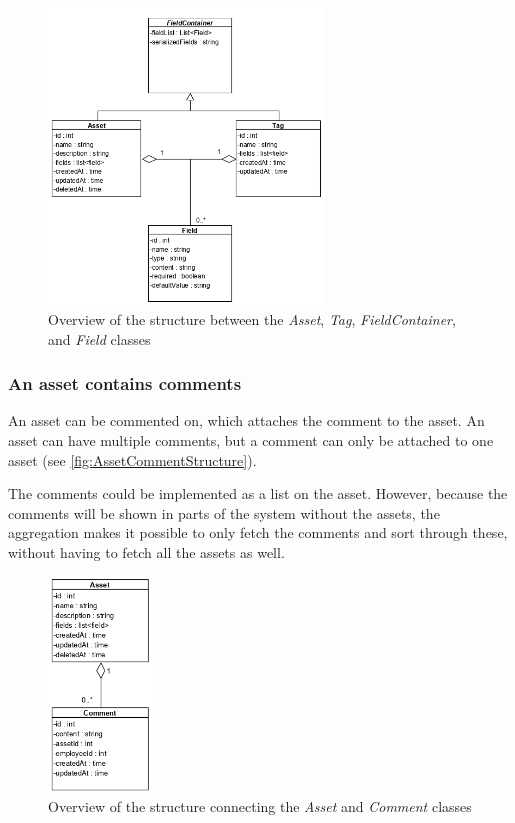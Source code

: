 \begin{figure}[H]
    \centering
    \includegraphics[width=0.65\textwidth]{figures/Structures/AssetTagFieldStructure.png}
    \caption{Overview of the structure between the \textit{Asset}, \textit{Tag}, \textit{FieldContainer}, and \textit{Field} classes}
    \label{fig:AssetTagFieldStructure}
\end{figure}

\newpage

\subsubsection{An asset contains comments}
An asset can be commented on, which attaches the comment to the asset. An asset can have multiple comments, but a comment can only be attached to one asset (see \autoref{fig:AssetCommentStructure}). 
\par
The comments could be implemented as a list on the asset. However, because the comments will be shown in parts of the system without the assets, the aggregation makes it possible to only fetch the comments and sort through these, without having to fetch all the assets as well.

\begin{figure}[H]
    \centering
    \includegraphics[width=0.25\textwidth]{figures/Structures/AssetCommentStructure.png}
    \caption{Overview of the structure connecting the \textit{Asset} and \textit{Comment} classes}
    \label{fig:AssetCommentStructure}
\end{figure}

